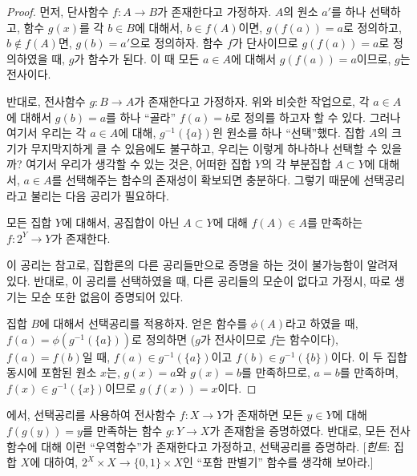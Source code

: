 \begin{proof}
    먼저, 단사함수 $f: A \to B$가 존재한다고 가정하자.
    $A$의 원소 $a'$를 하나 선택하고, 함수 $g(x)$를 각 $b \in B$에 대해서, $b \in f(A)$이면, $g(f(a)) = a$로 정의하고, $b \not\in f(A)$면, $g(b) = a'$으로 정의하자.
    함수 $f$가 단사이므로 $g(f(a)) = a$로 정의하였을 때, $g$가 함수가 된다.
    이 때 모든 $a \in A$에 대해서 $g(f(a)) = a$이므로, $g$는 전사이다.

    반대로, 전사함수 $g: B \to A$가 존재한다고 가정하자.
    위와 비슷한 작업으로, 각 $a \in A$에 대해서 $g(b) = a$를 하나 ``골라''  $f(a) = b$로 정의를 하고자 할 수 있다.
    그러나 여기서 우리는 각 $a \in A$에 대해, $g^{-1}(\{a\})$읜 원소를 하나 ``선택''했다.
    집합 $A$의 크기가 무지막지하게 클 수 있음에도 불구하고, 우리는 이렇게 하나하나 선택할 수 있을까?
    여기서 우리가 생각할 수 있는 것은, 어떠한 집합 $Y$의 각 부분집합 $A \subset Y$에 대해서, $a \in A$를 선택해주는 함수의 존재성이 확보되면 충분하다.
    그렇기 때문에 선택공리라고 불리는 다음 공리가 필요하다.
    
\begin{axiom}[선택공리]
\label{axm:choice}
    모든 집합 $Y$에 대해서, 공집합이 아닌 $A \subset Y$에 대해 $f(A) \in A$를 만족하는 $f: 2^Y \to Y$가 존재한다.
\end{axiom}
    이 공리는 참고로, 집합론의 다른 공리들만으로 증명을 하는 것이 불가능함이 알려져 있다.
    반대로, 이 공리를 선택하였을 때, 다른 공리들의 모순이 없다고 가정시, 따로 생기는 모순 또한 없음이 증명되어 있다.

    집합 $B$에 대해서 선택공리를 적용하자.
    얻은 함수를 $\phi(A)$라고 하였을 때, $f(a) = \phi(g^{-1}(\{a\}))$로 정의하면 ($g$가 전사이므로 $f$는 함수이다), $f(a) = f(b)$일 때, $f(a) \in g^{-1}(\{a\})$이고 $f(b) \in g^{-1}(\{b\})$이다.
    이 두 집합 동시에 포함된 원소 $x$는, $g(x) = a$와 $g(x) = b$를 만족하므로, $a = b$를 만족하며, $f(x) \in g^{-1}(\{x\})$이므로 $g(f(x)) = x$이다.
\end{proof}

\begin{exercise}
    에서, 선택공리를 사용하여 전사함수 $f: X \to Y$가 존재하면 모든 $y \in Y$에 대해 $f(g(y)) = y$를 만족하는 함수 $g: Y \to X$가 존재함을 증명하였다.
    반대로, 모든 전사함수에 대해 이런 ``우역함수''가 존재한다고 가정하고, 선택공리를 증명하라.
    [\textit{힌트}: 집합 $X$에 대하여, $2^X \times X \to \{0, 1\} \times X$인 ``포함 판별기'' 함수를 생각해 보아라.]
\end{exercise}

